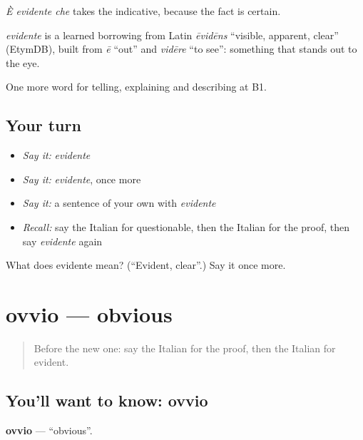 \emph{È evidente che} takes the indicative, because the fact is certain.

\begin{cousinweb}
\emph{evidente} is a learned borrowing from Latin \emph{ēvidēns} \textquotedblleft{}visible, apparent, clear\textquotedblright{} (EtymDB), built from \emph{ē} \textquotedblleft{}out\textquotedblright{} and \emph{vidēre} \textquotedblleft{}to see\textquotedblright{}: something that stands out to the eye.
\end{cousinweb}

\begin{grammarlens}[title={What you've built}]
One more word for telling, explaining and describing at B1.
\end{grammarlens}

\subsection*{Your turn}
\begin{itemize}
\raggedright
  \item \emph{Say it:} \emph{evidente}
  \item \emph{Say it:} \emph{evidente}, once more
  \item \emph{Say it:} a sentence of your own with \emph{evidente}
  \item \emph{Recall:} say the Italian for questionable, then the Italian for the proof, then say \emph{evidente} again
\end{itemize}

\begin{tcolorbox}[breakable,colback=teal!4,colframe=teal!35!black,title={Before you move on}]
What does evidente mean? (\textquotedblleft{}Evident, clear\textquotedblright{}.) Say it once more.
\end{tcolorbox}
\section[ovvio]{ovvio — obvious}

\label{lesson:IT-C344-ovvio}



\begin{quote}
Before the new one: say the Italian for the proof, then the Italian for evident.
\end{quote}

\subsection*{You'll want to know: ovvio}
\textbf{ovvio} — \textquotedblleft{}obvious\textquotedblright{}.

